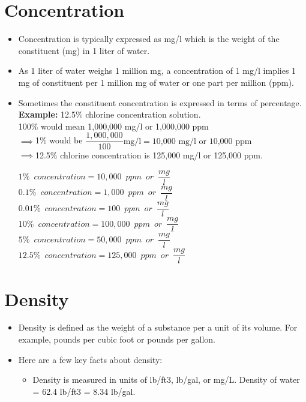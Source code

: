 \section{Concentration}
\begin{itemize}
\item Concentration is typically expressed as mg/l which is the weight of the constituent (mg) in 1 liter of water.
\item As 1 liter of water weighs 1 million mg, a concentration of 1 mg/l implies 1 mg of constituent per 1 million mg of water or one part per million (ppm).   
\item Sometimes the constituent concentration is expressed in terms of percentage.\\
\vspace{6pt}
\textbf{Example:} 12.5\% chlorine concentration solution.\\
\vspace{0.2cm}
100\% would mean 1,000,000 mg/l or 1,000,000 ppm\\
\vspace{0.2cm}
$\implies$1\% would be $\dfrac{1,000,000}{100}\textrm{mg/l} = \textrm{10,000 mg/l or 10,000 ppm}$\\
\vspace{0.2cm}
$\implies$12.5\% chlorine concentration is 125,000 mg/l or 125,000 ppm.
\vspace{6pt}

$1\% \enspace concentration = 10,000 \enspace ppm \enspace or \enspace\dfrac{mg}{l}$\\
$0.1\% \enspace concentration = 1,000 \enspace ppm \enspace or \enspace \dfrac{mg}{l}$\\
$0.01\% \enspace concentration = 100 \enspace ppm \enspace or \enspace \dfrac{mg}{l}$\\
$10\% \enspace concentration = 100,000 \enspace ppm \enspace or \enspace \dfrac{mg}{l}$\\
$5\% \enspace concentration = 50,000 \enspace ppm \enspace or \enspace \dfrac{mg}{l}$\\
$12.5\% \enspace concentration = 125,000 \enspace ppm \enspace or \enspace \dfrac{mg}{l}$\\
\end{itemize}

\section{Density}
\begin{itemize}
\item Density is defined as the weight of a substance per a unit of its volume. For example, pounds per cubic foot or pounds per gallon.

\item Here are a few key facts about density:
\begin{itemize}

\item Density is measured in units of lb/ft3, lb/gal, or mg/L. Density of water = 62.4 lb/ft3 = 8.34 lb/gal.
\end{itemize}
\end{itemize}

